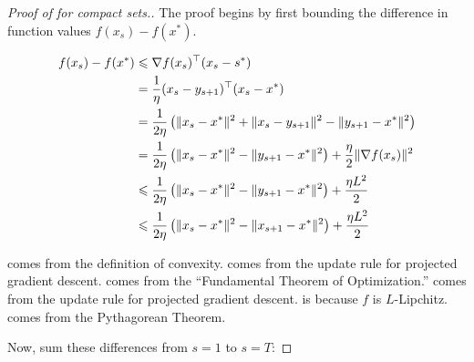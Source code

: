 \begin{proof}[Proof of  for compact sets.]

The proof begins by first bounding the difference in function values $f(x_s) -
f(x^*)$.

\begin{align}
    f(x_s) - f(x^*) &\leq \nabla f(x_s)^\trans (x_s - s^*) \equationlabel{a} \\
    &= \frac{1}{\eta}(x_s - y_{s+1})^\trans(x_s - x^*) \equationlabel{b} \\
    &= \frac{1}{2\eta} \left(\lVert x_s - x^* \rVert^2 + \lVert x_s - y_{s+1} \rVert^2 - \lVert y_{s+1} - x^* \rVert^2 \right) \equationlabel{c} \\
    &= \frac{1}{2\eta} \left(\lVert x_s - x^* \rVert^2 - \lVert y_{s+1} - x^* \rVert^2 \right) + \frac{\eta}{2} \lVert \nabla f(x_s) \rVert^2 \equationlabel{d} \\
    &\leq \frac{1}{2\eta} \left(\lVert x_s - x^* \rVert^2 - \lVert y_{s+1} - x^* \rVert^2 \right) + \frac{\eta L^2}{2} \equationlabel{e} \\
    &\leq \frac{1}{2\eta} \left(\lVert x_s - x^* \rVert^2 - \lVert x_{s+1} - x^* \rVert^2 \right) + \frac{\eta L^2}{2} \equationlabel{f} \\
\end{align}

 comes from the definition of convexity.  comes
from the update rule for projected gradient descent.  comes from
the ``Fundamental Theorem of Optimization.''  comes from the
update rule for projected gradient descent.  is because $f$ is
$L$-Lipchitz.  
comes from the Pythagorean Theorem.

Now, sum these differences from $s=1$ to $s=T$:



\end{proof}
